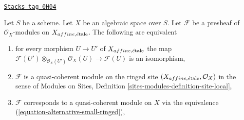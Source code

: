 \begin{lemma}
\label{spaces-descent-lemma-quasi-coherent-alternative-small}
\href{https://stacks.math.columbia.edu/tag/0H04}{\texttt{Stacks tag 0H04}}

Let $S$ be a scheme. Let $X$ be an algebraic space over $S$.
Let $\mathcal{F}$ be a presheaf of $\mathcal{O}_X$-modules
on $X_{affine, \acute{e}\text{tale}}$. The following are equivalent
\begin{enumerate}
\item for every morphism $U \to U'$ of $X_{affine, \acute{e}\text{tale}}$ the map
$\mathcal{F}(U') \otimes_{\mathcal{O}_X(U')} \mathcal{O}_X(U)
\to \mathcal{F}(U)$ is an isomorphism,
\item $\mathcal{F}$ is a quasi-coherent module on the ringed site
$(X_{affine, \acute{e}\text{tale}}, \mathcal{O}_X)$ in the sense of
Modules on Sites, Definition \ref{sites-modules-definition-site-local},
\item $\mathcal{F}$ corresponds to a quasi-coherent module on $X$
via the equivalence (\ref{equation-alternative-small-ringed}),
\end{enumerate}
\end{lemma}

